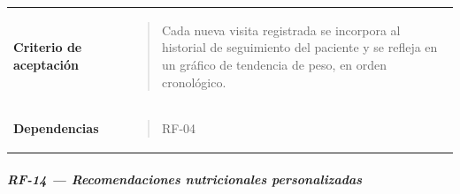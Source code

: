 \documentclass[
]{article}
\begin{document}
{\begin{longtable}[]{@{}
  >{\raggedright\arraybackslash}p{}
  >{\raggedright\arraybackslash}p{}@{}}
\textbf{Criterio de aceptación} &
\begin{minipage}[t]{\linewidth}\raggedright
\begin{quote}
Cada nueva visita registrada se incorpora al historial de seguimiento
del paciente y se refleja en un gráfico de tendencia de peso, en orden
cronológico.
\end{quote}
\end{minipage} \\
\textbf{Dependencias} & \begin{minipage}[t]{\linewidth}\raggedright
\begin{quote}
RF-04
\end{quote}
\end{minipage} \\
\end{longtable}
}

\subparagraph{RF-14 --- Recomendaciones nutricionales
personalizadas}\label{rf-14-recomendaciones-nutricionales-personalizadas}
\end{document}
